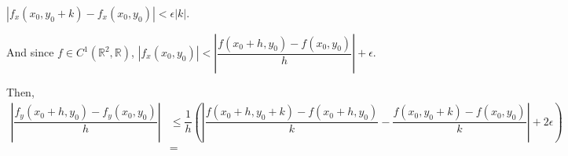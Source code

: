 \documentclass[12pt]{article}
\begin{document}
\begin{enumerate}
    $\left| f_x(x_0, y_0 + k) - f_x(x_0, y_0)\right| < \epsilon|k|$.

    And since $f \in C^1(\mathbb{R}^2, \mathbb{R})$, $|f_x(x_0, y_0)| < |\dfrac{f(x_0+h, y_0) - f(x_0, y_0)}{h}|+\epsilon$.


    Then, \begin{align*}
        |\dfrac{f_y(x_0+h, y_0) - f_y(x_0, y_0)}{h}| &\leq \dfrac{1}{h}\left(\left|\dfrac{f(x_0+h, y_0 + k) - f(x_0+h, y_0)}{k} - \dfrac{f(x_0, y_0 + k) - f(x_0, y_0)}{k}\right| + 2\epsilon\right)\\
        &=
    \end{align*}
\end{enumerate}
\end{document}
